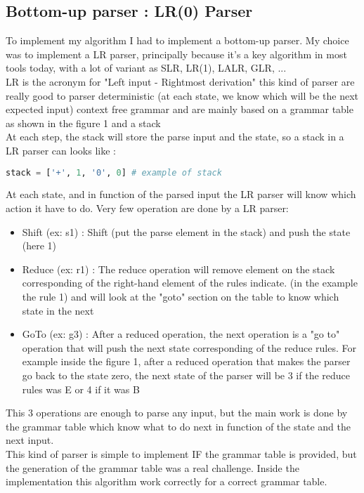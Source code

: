\subsection{Bottom-up parser : LR(0) Parser}
To implement my algorithm I had to implement a bottom-up parser. My choice was to implement a LR parser, principally because it's a key algorithm in most tools today, with a lot of variant as SLR, LR(1), LALR, GLR, ... \\
LR is the acronym for "Left input - Rightmost derivation" this kind of parser are really good to parser deterministic (at each state, we know which will be the next expected input) context free grammar and are mainly based on a grammar table as shown in the figure 1 and a stack\\
At each step, the stack will store the parse input and the state, so a stack in a LR parser can looks like :
\begin{lstlisting}[language=python, caption=example Lr parser stack]
stack = ['+', 1, '0', 0] # example of stack  
\end{lstlisting}
At each state, and in function of the parsed input the LR parser will know which action it have to do. Very few operation are done by a LR parser:
\begin{itemize}
\item Shift (ex: s1) : Shift (put the parse element in the stack) and push the state (here 1)
\item Reduce (ex: r1) : The reduce operation will remove element on the stack corresponding of the right-hand element of the rules indicate. (in the example the rule 1) and will look at the "goto" section on the table to know which state in the next
\item GoTo (ex: g3) : After a reduced operation, the next operation is a "go to" operation that will push the next state corresponding of the reduce rules. For example inside the figure 1, after a reduced operation that makes the parser go back to the state zero, the next state of the parser will be 3 if the reduce rules was E or 4 if it was B
\end{itemize}
This 3 operations are enough to parse any input, but the main work is done by the grammar table which know what to do next in function of the state and the next input.\\
This kind of parser is simple to implement IF the grammar table is provided, but the generation of the grammar table was a real challenge. Inside the implementation this algorithm work correctly for a correct grammar table.

